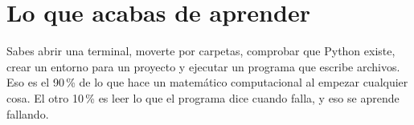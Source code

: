 \section{Lo que acabas de aprender}

Sabes abrir una terminal, moverte por carpetas, comprobar que Python existe, crear un entorno para un proyecto y ejecutar un programa que escribe archivos. Eso es el 90\,\% de lo que hace un matemático computacional al empezar cualquier cosa. El otro 10\,\% es leer lo que el programa dice cuando falla, y eso se aprende fallando.

